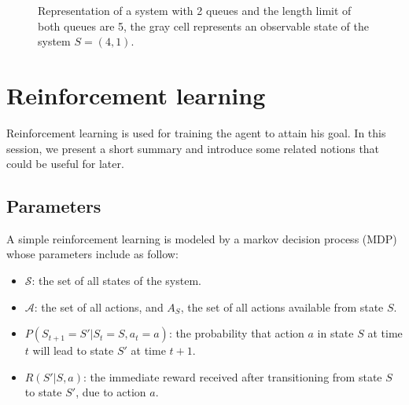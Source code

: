 \documentclass[
  a4paper, xcolor = usenames,dvipsnames]{article}
\providecommand{\tightlist}{%
  \setlength{\itemsep}{0pt}\setlength{\parskip}{0pt}}
\begin{document}
\begin{figure}
\centering
\def\mycolumns{5}
\def\myrows{5}
\caption[Representation of a system with 2 queues]{Representation of a system with 2 queues and the length limit of both queues are 5, the gray cell represents an observable state of the system $S = (4, 1).$}
\end{figure}

\hypertarget{reinforcement-learning}{%
\section{Reinforcement learning}\label{reinforcement-learning}}

Reinforcement learning is used for training the agent to attain his goal. In this session, we present a short summary and introduce some related notions that could be useful for later.

\hypertarget{parameters-2}{%
\subsection{Parameters}\label{parameters-2}}

A simple reinforcement learning is modeled by a markov decision process (MDP) whose parameters include as follow:

\begin{itemize}
\tightlist
\item
  \(\mathcal{S}\): the set of all states of the system.
\item
  \(\mathcal{A}\): the set of all actions, and \(A_{S}\), the set of all actions available from state \(S\).
\item
  \(P(S_{t + 1} = S' | S_{t} = S, a_{t} = a)\): the probability that action \(a\) in state \(S\) at time \(t\) will lead to state \(S'\) at time \(t + 1\).
\item
  \(R(S' | S, a)\): the immediate reward received after transitioning from state \(S\) to state \(S'\), due to action \(a\).
\end{itemize}
\end{document}
